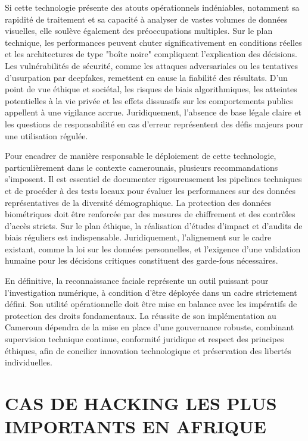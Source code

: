 \documentclass[12pt, a4paper]{article}
\begin{document}
		Si cette technologie présente des atouts opérationnels indéniables, notamment sa rapidité de traitement et sa capacité à analyser de vastes volumes de données visuelles, elle soulève également des préoccupations multiples. Sur le plan technique, les performances peuvent chuter significativement en conditions réelles et les architectures de type "boîte noire" compliquent l'explication des décisions. Les vulnérabilités de sécurité, comme les attaques adversariales ou les tentatives d'usurpation par deepfakes, remettent en cause la fiabilité des résultats. D'un point de vue éthique et sociétal, les risques de biais algorithmiques, les atteintes potentielles à la vie privée et les effets dissuasifs sur les comportements publics appellent à une vigilance accrue. Juridiquement, l'absence de base légale claire et les questions de responsabilité en cas d'erreur représentent des défis majeurs pour une utilisation régulée.
		
		Pour encadrer de manière responsable le déploiement de cette technologie, particulièrement dans le contexte camerounais, plusieurs recommandations s'imposent. Il est essentiel de documenter rigoureusement les pipelines techniques et de procéder à des tests locaux pour évaluer les performances sur des données représentatives de la diversité démographique. La protection des données biométriques doit être renforcée par des mesures de chiffrement et des contrôles d'accès stricts. Sur le plan éthique, la réalisation d'études d'impact et d'audits de biais réguliers est indispensable. Juridiquement, l'alignement sur le cadre existant, comme la loi sur les données personnelles, et l'exigence d'une validation humaine pour les décisions critiques constituent des garde-fous nécessaires.
		
		En définitive, la reconnaissance faciale représente un outil puissant pour l'investigation numérique, à condition d'être déployée dans un cadre strictement défini. Son utilité opérationnelle doit être mise en balance avec les impératifs de protection des droits fondamentaux. La réussite de son implémentation au Cameroun dépendra de la mise en place d'une gouvernance robuste, combinant supervision technique continue, conformité juridique et respect des principes éthiques, afin de concilier innovation technologique et préservation des libertés individuelles.
		
		\section{CAS DE HACKING LES PLUS IMPORTANTS EN AFRIQUE}
		
\end{document}
